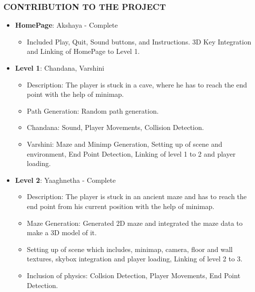 \documentclass[9pt]{beamer}
\begin{document}
\begin{frame}
    \frametitle{CONTRIBUTION TO THE PROJECT}
    \begin{itemize}
        \item \textbf{HomePage}: Akshaya - Complete
            \begin{itemize}
                \item Included Play, Quit, Sound buttons, and Instructions. 3D Key Integration and Linking of HomePage to Level 1.
            \end{itemize}
        \vspace{0.5em}
        \item \textbf{Level 1}: Chandana, Varshini
            \begin{itemize}
                \item Description: The player is stuck in a cave, where he has to reach the end point with the help of minimap.
                \item Path Generation: Random path generation.
                \item Chandana: Sound, Player Movements, Collision Detection.
                \item Varshini: Maze and Minimp Generation, Setting up of scene and environment, End Point Detection, Linking of level 1 to 2 and player loading.
            \end{itemize}
            \vspace{0.5em}
        \item \textbf{Level 2}: Yaaghnetha - Complete
            \begin{itemize}
                \item Description: The player is stuck in an ancient maze and has to reach the end point from his current position with the help of minimap.
                \item Maze Generation: Generated 2D maze and integrated the maze data to make a 3D model of it.
                \item Setting up of scene which includes, minimap, camera, floor and wall textures, skybox integration and player loading, Linking of level 2 to 3.
                \item Inclusion of physics: Collsion Detection, Player Movements, End Point Detection.
            \end{itemize}
        \end{itemize}
\end{frame}
\end{document}
